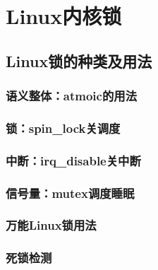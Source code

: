 
\part{Linux内核锁}

\chapter{Linux锁的种类及用法}

\section{语义整体：atmoic的用法}

\section{锁：spin\_lock关调度}

\section{中断：irq\_disable关中断}

\section{信号量：mutex调度睡眠}

\section{万能Linux锁用法}

\section{死锁检测}